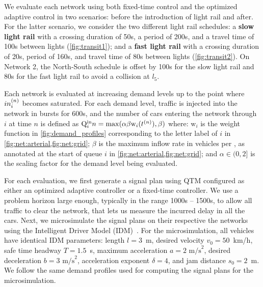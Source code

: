 We evaluate each network using both fixed-time control and the optimized
adaptive control in two scenarios: before the introduction of light rail and
after.
%
For the latter scenario, we consider the two different light rail schedules:
%
a \textbf{slow light rail} with a crossing duration of 50s, a period of 200s, and a
travel time of 100s between lights (\cref{fig:transit1});
%
and a \textbf{fast light rail} with a crossing duration of 20s, period of 160s, and
travel time of 80s between lights (\cref{fig:transit2}).
%
On Network 2, the North-South schedule is offset by 100s for the slow light rail
and 80s for the fast light rail to avoid a collision at $l_5$.


%
%
Each network is evaluated at increasing demand levels up to the point where
$\inq{i}$ becomes saturated.
%
%
For each demand level, traffic is injected into the network in bursts for 600s,
and the number of cars entering the network through $i$ at time $n$ is defined
as $\QIN{i}{n} = \mathrm{max}(\alpha \beta \mathrm{w}_i(\tn[n]),\beta)$ where:
%
$\mathrm{w}_i$ is the weight function in \cref{fig:demand_profiles}
corresponding to the letter label of $i$ in \cref{fig:net:arterial,fig:net:grid};
%
$\beta$ is the maximum inflow rate in vehicles per \DT, as annotated at the
start of queue $i$ in \cref{fig:net:arterial,fig:net:grid}; and
%
$\alpha \in (0,2]$ is the scaling factor for the demand level being evaluated.


For each evaluation, we first generate a signal plan using QTM configured as
either an optimized adaptive controller or a fixed-time controller.
%
We use a problem horizon \TMAX large enough, typically in the range 1000s --
1500s, to allow all traffic to clear the network, that lets us measure the
incurred delay in all the cars.
%
Next, we microsimulate the signal plans on their respective the networks using
the Intelligent Driver Model (IDM)~\cite{treiber2000congested}.
%
For the microsimulation, all vehicles have identical IDM parameters: length
$l=3$~m, desired velocity $v_0 = 50$~km/h, safe time headway $T=1.5$~s, maximum
acceleration $a=2 \text{ m/s}^2$, desired deceleration $b = 3 \text{ m/s}^2$,
acceleration exponent $\delta = 4$, and jam distance $s_0 = 2$~m.
%
We follow the same demand profiles used for computing the signal plans for the
microsimulation.


